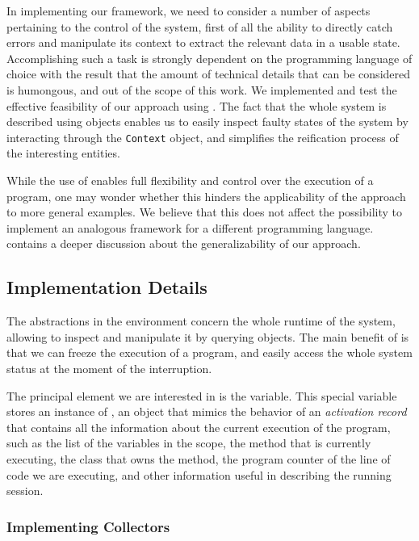 In implementing our framework, we need to consider a number of aspects pertaining to the control of the system, first of all the ability to directly catch errors and manipulate its context to extract the relevant data in a usable state.
Accomplishing such a task is strongly dependent on the programming language of choice with the result that the amount of technical details that can be considered is humongous, and out of the scope of this work.
We implemented and test the effective feasibility of our approach using \pha.
The fact that the whole system is described using objects enables us to easily inspect faulty states of the system by interacting through the \texttt{Context} object, and simplifies the reification process of the interesting entities.

While the use of \pha enables full flexibility and control over the execution of a program, one may wonder whether this hinders the applicability of the approach to more general examples.
We believe that this does not affect the possibility to implement an analogous framework for a different programming language.
 contains a deeper discussion about the generalizability of our approach.

\subsection{Implementation Details}

The abstractions in the \pha environment concern the whole runtime of the system, allowing to inspect and manipulate it by querying objects.
The main benefit of \pha is that we can freeze the execution of a program, and easily access the whole system status at the moment of the interruption.

The principal element we are interested in is the  variable.
This special variable stores an instance of , an object that mimics the behavior of an \textit{activation record} that contains all the information about the current execution of the program, such as the list of the variables in the scope, the method that is currently executing, the class that owns the method, the program counter of the line of code we are executing, and other information useful in describing the running session.


\subsubsection{Implementing Collectors}


